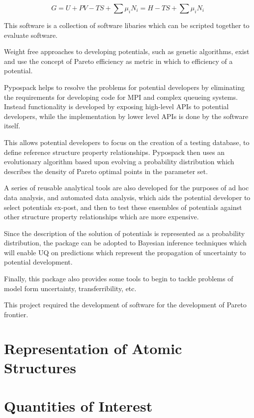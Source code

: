 \begin{equation}\label{eq:gibbs_free_energy}
  G = U+PV-TS + \sum \mu_i N_i = H - TS + \sum \mu_i N_i
\end{equation}

This software is a collection of software libaries which can be scripted together to evaluate software.

Weight free approaches to developing potentials, such as genetic algorithms, exist and use the concept of Pareto efficiency as metric in which to efficiency of a potential.

Pypospack helps to resolve the problems for potential developers by eliminating the requirements for developing code for MPI and complex queueing systems.  Instead functionality is developed by exposing high-level APIs to potential developers, while the implementation by lower level APIs is done by the software itself.

This allows potential developers to focus on the creation of a testing database, to define reference structure property relationships.  Pypospack then uses an evolutionary algorithm based upon evolving a probability distribution which describes the density of Pareto optimal points in the parameter set.

A series of reusable analytical tools are also developed for the purposes of ad hoc data analysis, and automated data analysis, which aids the potential developer to select potentials ex-post, and then to test these ensembles of potentials against other structure property relationships which are more expensive.

Since the description of the solution of potentials is represented as a probability distribution, the package can be adopted to Bayesian inference techniques which will enable UQ on predictions which represent the propagation of uncertainty to potential development.

Finally, this package also provides some tools to begin to tackle problems of model form uncertainty, transferribility, etc.

This project required the development of software for the development of Pareto frontier.

\section{Representation of Atomic Structures}


\section{Quantities of Interest}

